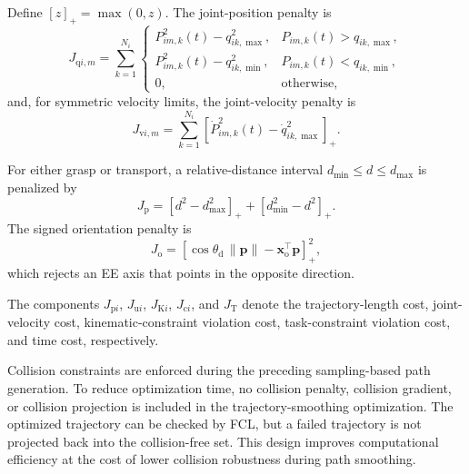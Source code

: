 
Define $[z]_{+}=\max(0,z)$. The joint-position penalty is
\begin{equation}
J_{\mathrm q i,m}
=\sum_{k=1}^{N_i}
\begin{cases}
P_{im,k}^{2}(t)-q_{ik,\max}^{2},
&P_{im,k}(t)>q_{ik,\max},\\
P_{im,k}^{2}(t)-q_{ik,\min}^{2},
&P_{im,k}(t)<q_{ik,\min},\\
0,&\text{otherwise},
\end{cases}
\label{eq:MINCO_joint_limit_revised}
\end{equation}
and, for symmetric velocity limits, the joint-velocity penalty is
\begin{equation}
J_{\mathrm v i,m}
=\sum_{k=1}^{N_i}
\left[
\dot P_{im,k}^{2}(t)-\dot q_{ik,\max}^{2}
\right]_{+}.
\label{eq:MINCO_velocity_limit_revised}
\end{equation}

For either grasp or transport, a relative-distance interval
$d_{\min}\leq d\leq d_{\max}$ is penalized by
\begin{equation}
J_{\mathrm p}
=\left[d^{2}-d_{\max}^{2}\right]_{+}
+\left[d_{\min}^{2}-d^{2}\right]_{+}.
\label{eq:MINCO_distance_penalty_revised}
\end{equation}
The signed orientation penalty is
\begin{equation}
J_{\mathrm o}
=\left[
\cos\theta_{\mathrm d}\,\|\boldsymbol p\|
-\boldsymbol{x}_{\mathrm o}^{\top}\boldsymbol p
\right]_{+}^{2},
\label{eq:MINCO_orientation_penalty_revised}
\end{equation}
which rejects an EE axis that points in the opposite direction.


The components $J_{\mathrm p i}$, $J_{\mathrm u i}$,
$J_{\mathrm K i}$, $J_{\mathrm c i}$, and $J_{\mathrm T}$ denote the
trajectory-length cost, joint-velocity cost, kinematic-constraint violation
cost, task-constraint violation cost, and time cost, respectively.

Collision constraints are enforced during the preceding sampling-based path
generation. To reduce optimization time, no collision penalty, collision
gradient, or collision projection is included in the trajectory-smoothing
optimization. The optimized trajectory can be checked by FCL, but a failed
trajectory is not projected back into the collision-free set. This design
improves computational efficiency at the cost of lower collision robustness
during path smoothing.

